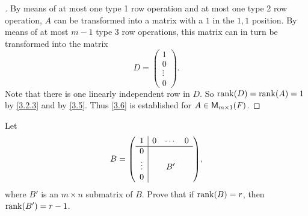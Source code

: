 \begin{proof}[]
  By means of at most one type 1 row operation and at most one type 2 row operation, \(A\) can be transformed into a matrix with a \(1\) in the \(1,1\) position.
  By means of at most \(m - 1\) type 3 row operations, this matrix can in turn be transformed into the matrix
  \[
    D = \begin{pmatrix}
      1      \\
      0      \\
      \vdots \\
      0
    \end{pmatrix}.
  \]
  Note that there is one linearly independent row in \(D\).
  So \(\rk{D} = \rk{A} = 1\) by \cref{3.2.3} and by \cref{3.5}.
  Thus \cref{3.6} is established for \(A \in \ms[m][1][\F]\).
\end{proof}

\begin{ex}\label{ex:3.2.11}
  Let
  \[
    B = \pa{\begin{array}{c|ccc}
        1      & 0 & \cdots & 0 \\
        \hline
        0      &   &        &   \\
        \vdots &   & B'     &   \\
        0      &   &        &
      \end{array}},
  \]
  where \(B'\) is an \(m \times n\) submatrix of \(B\).
  Prove that if \(\rk{B} = r\), then \(\rk{B'} = r - 1\).
\end{ex}

